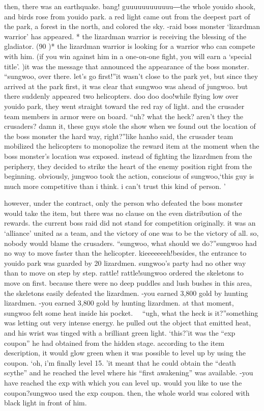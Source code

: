 then, there was an earthquake.
bang! guuuuuuuuuuuu―the whole youido shook, and birds rose from youido park.
 a red light came out from the deepest part of the park, a forest in the north, and colored the sky.
-raid boss monster ‘lizardman warrior’ has appeared.
* the lizardman warrior is receiving the blessing of the gladiator.
 (90%
)* the lizardman warrior is looking for a warrior who can compete with him.
 (if you win against him in a one-on-one fight, you will earn a ‘special title’.
)it was the message that announced the appearance of the boss monster.
“sungwoo, over there.
 let’s go first!”it wasn’t close to the park yet, but since they arrived at the park first, it was clear that sungwoo was ahead of jungwoo.
but there suddenly appeared two helicopters.
doo doo doo!while flying low over youido park, they went straight toward the red ray of light.
and the crusader team members in armor were on board.
“uh? what the heck? aren’t they the crusaders? damn it, these guys stole the show when we found out the location of the boss monster the hard way, right?”like hanho said, the crusader team mobilized the helicopters to monopolize the reward item at the moment when the boss monster’s location was exposed.
instead of fighting the lizardmen from the periphery, they decided to strike the heart of the enemy position right from the beginning.
 obviously, jungwoo took the action, conscious of sungwoo,‘this guy is much more competitive than i think.
 i can’t trust this kind of person.
’

however, under the contract, only the person who defeated the boss monster would take the item, but there was no clause on the even distribution of the rewards.
the current boss raid did not stand for competition originally.
 it was an ‘alliance’ united as a team, and the victory of one was to be the victory of all.
 so, nobody would blame the crusaders.
“sungwoo, what should we do?”sungwoo had no way to move faster than the helicopter.
kieeeeeeeh!besides, the entrance to youido park was guarded by 20 lizardmen.
sungwoo’s party had no other way than to move on step by step.
rattle! rattle!sungwoo ordered the skeletons to move on first.
 because there were no deep puddles and lush bushes in this area, the skeletons easily defeated the lizardmen.
-you earned 3,800 gold by hunting lizardmen.
-you earned 3,800 gold by hunting lizardmen.
at that moment, sungwoo felt some heat inside his pocket.
  “ugh, what the heck is it?”something was letting out very intense energy.
 he pulled out the object that emitted heat, and his wrist was tinged with a brilliant green light.
‘this?’it was the “exp coupon” he had obtained from the hidden stage.
 according to the item description, it would glow green when it was possible to level up by using the coupon.
‘oh, i’m finally level 15.
’it meant that he could obtain the “death scythe” and he reached the level where his “first awakening” was available.
-you have reached the exp with which you can level up.
 would you like to use the coupon?sungwoo used the exp coupon.
then, the whole world was colored with black light in front of him.


 